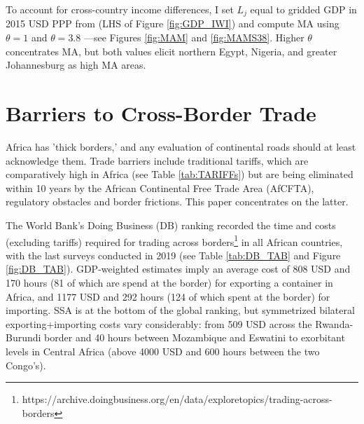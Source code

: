\documentclass[a4paper]{article}
\begin{document}
To account for cross-country income differences, I set $L_j$ equal to gridded GDP in 2015 USD PPP from \citet{kummu2018gridded} (LHS of Figure \ref{fig:GDP_IWI}) and compute MA using $\theta = 1$ \citep{Peng2021} and $\theta = 3.8$ \citep{jedwab2022average}---see Figures \ref{fig:MAM} and \ref{fig:MAMS38}. Higher $\theta$ concentrates MA, but both values elicit northern Egypt, Nigeria, and greater Johannesburg as high MA areas.

\section{Barriers to Cross-Border Trade}

Africa has 'thick borders,' and any evaluation of continental roads should at least acknowledge them. Trade barriers include traditional tariffs, which are comparatively high in Africa (see Table \ref{tab:TARIFFs}) but are being eliminated within 10 years by the African Continental Free Trade Area (AfCFTA), regulatory obstacles and border frictions. This paper concentrates on the latter. \newline %


The World Bank's Doing Business (DB) ranking recorded the time and costs (excluding tariffs) required for trading across borders\footnote{https://archive.doingbusiness.org/en/data/exploretopics/trading-across-borders} in all African countries, with the last surveys conducted in 2019 (see Table \ref{tab:DB_TAB} and Figure \ref{fig:DB_TAB}). GDP-weighted estimates imply an average cost of 808 USD and 170 hours (81 of which are spend at the border) for exporting a container in Africa, and 1177 USD and 292 hours (124 of which spent at the border) for importing. SSA is at the bottom of the global ranking, but symmetrized bilateral exporting+importing costs vary considerably: from 509 USD across the Rwanda-Burundi border and 40 hours between Mozambique and Eswatini to exorbitant levels in Central Africa (above 4000 USD and 600 hours between the two Congo's). \newline

\end{document}
